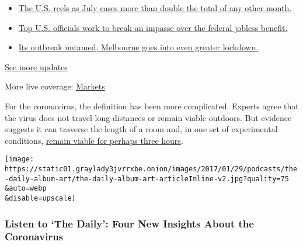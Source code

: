 \begin{itemize}
\tightlist
\item
  \href{https://www.nytimes3xbfgragh.onion/2020/08/01/world/coronavirus-covid-19.html?action=click\&pgtype=Article\&state=default\&region=MAIN_CONTENT_1\&context=storylines_live_updates\#link-34047410}{The
  U.S. reels as July cases more than double the total of any other
  month.}
\item
  \href{https://www.nytimes3xbfgragh.onion/2020/08/01/world/coronavirus-covid-19.html?action=click\&pgtype=Article\&state=default\&region=MAIN_CONTENT_1\&context=storylines_live_updates\#link-780ec966}{Top
  U.S. officials work to break an impasse over the federal jobless
  benefit.}
\item
  \href{https://www.nytimes3xbfgragh.onion/2020/08/01/world/coronavirus-covid-19.html?action=click\&pgtype=Article\&state=default\&region=MAIN_CONTENT_1\&context=storylines_live_updates\#link-2bc8948}{Its
  outbreak untamed, Melbourne goes into even greater lockdown.}
\end{itemize}

\href{https://www.nytimes3xbfgragh.onion/2020/08/01/world/coronavirus-covid-19.html?action=click\&pgtype=Article\&state=default\&region=MAIN_CONTENT_1\&context=storylines_live_updates}{See
more updates}

More live coverage:
\href{https://www.nytimes3xbfgragh.onion/live/2020/07/31/business/stock-market-today-coronavirus?action=click\&pgtype=Article\&state=default\&region=MAIN_CONTENT_1\&context=storylines_live_updates}{Markets}

For the coronavirus, the definition has been more complicated. Experts
agree that the virus does not travel long distances or remain viable
outdoors. But evidence suggests it can traverse the length of a room
and, in one set of experimental conditions,
\href{https://www.nytimes3xbfgragh.onion/2020/03/17/health/coronavirus-surfaces-aerosols.html}{remain
viable for perhaps three hours}.

\texttt{[image: https://static01.graylady3jvrrxbe.onion/images/2017/01/29/podcasts/the-daily-album-art/the-daily-album-art-articleInline-v2.jpg?quality=75\\\&auto=webp\\\&disable=upscale]}

\hypertarget{listen-to-the-daily-four-new-insights-about-the-coronavirus}{%
\subsubsection{Listen to `The Daily': Four New Insights About the
Coronavirus}\label{listen-to-the-daily-four-new-insights-about-the-coronavirus}}

